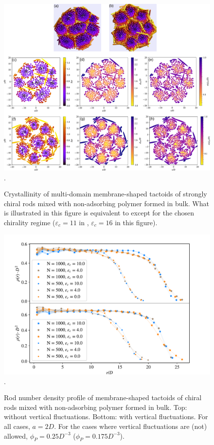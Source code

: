 \begin{figure}
\begin{center}
\includegraphics[width= \columnwidth]{figures/chapter-5/crystallinity_16}.
	\caption{ \label{crystal16} Crystallinity of multi-domain membrane-shaped tactoids of strongly chiral rods mixed with non-adsorbing polymer formed in bulk. What is illustrated in this figure is equivalent to  except for the chosen chirality regime ($\varepsilon_c=11$ in , $\varepsilon_c=16$ in this figure).}
\end{center}
\end{figure}


\begin{figure}
\begin{center}
\includegraphics[width= .9\columnwidth]{figures/chapter-5/density}.
	\caption{Rod number density profile of membrane-shaped tactoids of chiral rods mixed with non-adsorbing polymer formed in bulk. Top: without vertical fluctuations. Bottom: with vertical fluctuations. For all cases, $a = 2D$. For the cases where vertical fluctuations are (not) allowed, $\phi_P=0.25D^{-3}$ ($\phi_P=0.175D^{-3}$). } %
 \label{density}
\end{center}
\end{figure}


